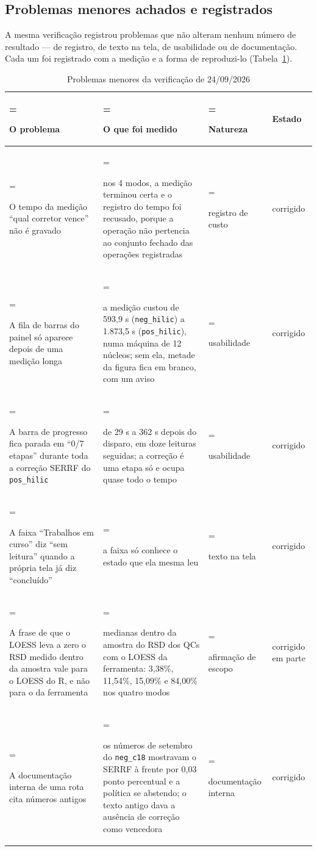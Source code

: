 \subsection{Problemas menores achados e registrados}\label{sec:5-2-6}

A mesma verificação registrou problemas que não alteram nenhum número de resultado --- de registro, de texto na tela, de usabilidade ou de documentação. Cada um foi registrado com a medição e a forma de reproduzi-lo (Tabela~\ref{tab:5-6}).

\begin{table}[htbp]
\centering
\caption{Problemas menores da verificação de 24/09/2026}\label{tab:5-6}
\normalsize
\begin{tabularx}{\linewidth}{|>{\hsize=1.29\hsize\linewidth=\hsize\raggedright\arraybackslash\hspace{0pt}}X|>{\hsize=1.29\hsize\linewidth=\hsize\raggedright\arraybackslash\hspace{0pt}}X|>{\hsize=0.42\hsize\linewidth=\hsize\raggedright\arraybackslash\hspace{0pt}}X|l|}
\hline
\textbf{O problema} & \textbf{O que foi medido} & \textbf{Natureza} & \textbf{Estado} \\
\hline
O tempo da medição ``qual corretor vence'' não é gravado & nos 4 modos, a medição terminou certa e o registro do tempo foi recusado, porque a operação não pertencia ao conjunto fechado das operações registradas & registro de custo & corrigido \\ \hline
A fila de barras do painel só aparece depois de uma medição longa & a medição custou de 593,9 s (\texttt{neg\_\allowbreak{}hilic}) a 1.873,5 s (\texttt{pos\_\allowbreak{}hilic}), numa máquina de 12 núcleos; sem ela, metade da figura fica em branco, com um aviso & usabilidade & corrigido \\ \hline
A barra de progresso fica parada em ``0/7 etapas'' durante toda a correção SERRF do \texttt{pos\_\allowbreak{}hilic} & de 29 s a 362 s depois do disparo, em doze leituras seguidas; a correção é uma etapa só e ocupa quase todo o tempo & usabilidade & corrigido \\ \hline
A faixa ``Trabalhos em curso'' diz ``sem leitura'' quando a própria tela já diz ``concluído'' & a faixa só conhece o estado que ela mesma leu & texto na tela & corrigido \\ \hline
A frase de que o LOESS leva a zero o RSD medido dentro da amostra vale para o LOESS do R, e não para o da ferramenta & medianas dentro da amostra do RSD dos QCs com o LOESS da ferramenta: 3,38\%, 11,54\%, 15,09\% e 84,00\% nos quatro modos & afirmação de escopo & corrigido em parte \\ \hline
A documentação interna de uma rota cita números antigos & os números de setembro do \texttt{neg\_\allowbreak{}c18} mostravam o SERRF à frente por 0,03 ponto percentual e a política se abstendo; o texto antigo dava a ausência de correção como vencedora & documentação interna & corrigido \\ \hline
\end{tabularx}
\end{table}


